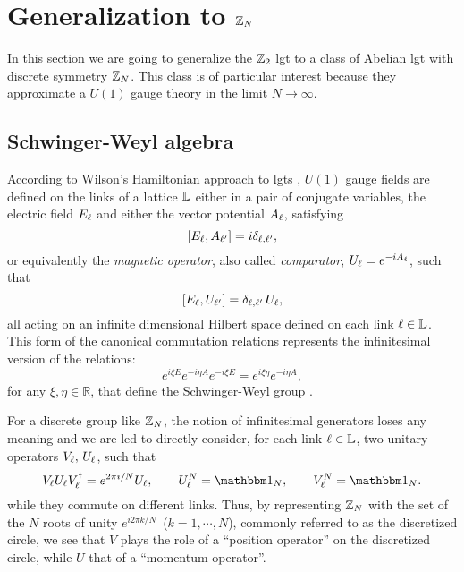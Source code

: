 \section{Generalization to \texorpdfstring{$\mathbb{Z}_N$}{Z\_N}}%
\label{sec:generalization_to_zn}
In this section we are going to generalize the $\mathbb{Z}_2$ \ac{lgt} to a class of Abelian \ac{lgt} with discrete symmetry $\mathbb{Z}_N$.
This class is of particular interest because they approximate a $U(1)$ gauge theory in the limit $N \to \infty$.



%
%
\subsection{Schwinger-Weyl algebra}%
\label{sub:schwinger_weyl_algebra}

According to Wilson's Hamiltonian approach to \ac{lgt}s \cite{wilson1974confinement}, $U(1)$ gauge fields are defined on the links of a lattice $\mathbb{L}$ either in a pair of conjugate variables, the electric field  $E_\ell$ and either the vector potential $A_\ell$, satisfying
\begin{equation}
    \comm{E_\link}{A_{\link^{\prime}}}  = i \delta_{\link , \link^{\prime} },
\end{equation}
or equivalently the \emph{magnetic operator}, also called \emph{comparator},
$U_\ell = e^{-i A_{\ell} }$, such that
\begin{equation}
    \comm{E_\link}{U_{\link^{\prime}}} =  \delta_{\link , \link^{\prime} } \, U_{\link},
\end{equation}
all acting on an infinite dimensional Hilbert space defined on each link $\ell \in \mathbb{L}$.
This form of the canonical commutation relations represents the infinitesimal version of the relations:
\begin{equation}
     e^{i\xi E} e^{-i\eta A } e^{-i\xi E} = e^{i\xi \eta} e^ {-i\eta A },
\end{equation}
for any $\xi, \eta \in \mathbb{R}$,
that define the Schwinger-Weyl group \cite{notarnicola2015discrete, ercolessi2018znmodels, schwinger1960unitary}.

For a discrete group like $\mathbb{Z}_N$, the notion of infinitesimal generators loses any meaning and we are led to directly consider, for each link $\ell \in \mathbb{L}$, two unitary operators
$V_\ell, \, U_\ell$, such that \cite{schwinger1960unitary, schwinger2001symbolism}
\begin{equation}
    V_\link U_\link V_\link^{\dagger}=e^{2\pi i/N}U_\link, \qquad
    U_\link^N=\identity_N, \qquad
    V_\link^N=\identity_N.
    \label{eq:schwinger_weyl_algebra}
\end{equation}
while they commute on different links.
Thus, by representing $\mathbb{Z}_N$  with the set of the $N$ roots of unity $e^{i 2 \pi k/N}$\, ($k=1, \cdots, N$), commonly referred to as the discretized circle,
we see that $V$ plays the role of a ``position operator'' on the discretized circle, while $U$ that of a ``momentum operator''.


